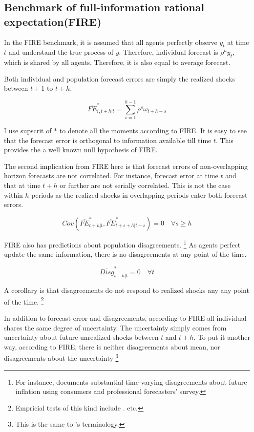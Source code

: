 \documentclass[]{article}
\begin{document}
\subsection{Benchmark of full-information rational expectation(FIRE)}

 In the FIRE benchmark,  it is assumed that all agents perfectly observe $y_t$ at time $t$ and understand the true process of $y$. Therefore, individual forecast is $\rho^h y_t $, which is shared by all agents. Therefore, it is also equal to average forecast. 

Both individual and population forecast errors are simply the realized shocks between $t+1$ to $t+h$.  

$$\overline{FE}^{*}_{i,t+h|t} = \sum^{h-1}_{s=1} \rho^s \omega_{t+h-s}$$ 


I use supscrit of $*$ to denote all the moments according to FIRE. It is easy to see that the forecast error is orthogonal to information available till time $t$. This provides the a well known null hypothesis of FIRE. \citet{xx}

The second implication from FIRE here is that forecast errors of non-overlapping horizon forecasts are not correlated. For instance, forecast error at time $t$ and that at time $t+h$ or further are not serially correlated. This is not the case within $h$ periods as the realized shocks in overlapping periods enter both forecast errors. 

$$Cov(\overline{FE}^{*}_{t+h|t}, \overline{FE}^{*}_{t+s+h|t+s}) = 0 \quad \forall s \geq h$$

FIRE also has predictions about  population disagreements. \footnote{For instance, \citet{mankiw2003disagreement} documents substantial time-varying disagreements about future inflation using consumers and professional forecasters' survey. } As agents perfect update the same information, there is no disagreements at any point of the time. 

$$\overline{Disg}^{*}_{t+h|t}=0 \quad \forall t$$

A corollary is that disagreements do not respond to realized shocks any any point of the time.  \footnote{Empricial tests of this kind include \citet{xx}.\citet{xx} etc. }

In addition to forecast error and disagreements, according to FIRE all individual shares the same degree of uncertainty. The uncertainty simply comes from uncertainty about future unrealized shocks between $t$ and $t+h$. To put it another way, according to FIRE, there is neither disagreements about mean, nor disagreements about the uncertainty \footnote{This is the same to \citet{}'s terminology.} 
\end{document}
